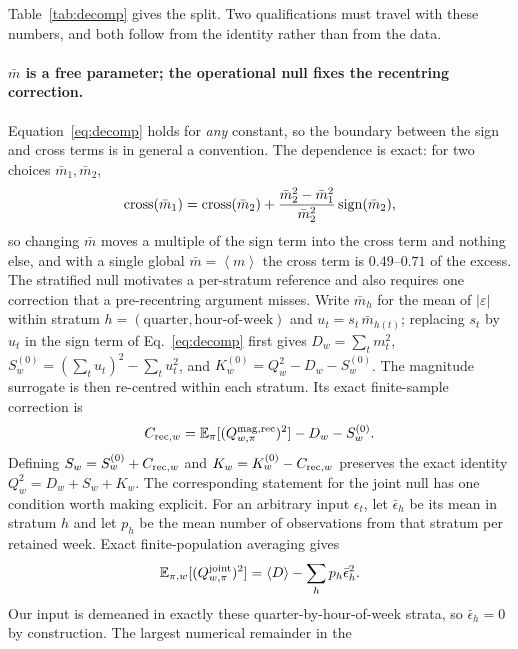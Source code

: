 \documentclass[aps,pre,twocolumn,superscriptaddress,floatfix,nofootinbib]{revtex4-2}
\newcommand{\eps}{\varepsilon}
\newcommand{\avg}[1]{\left\langle #1 \right\rangle}
\begin{document}
Table~\ref{tab:decomp} gives the split. Two qualifications must travel with
these numbers, and both follow from the identity rather than from the data.

\paragraph*{$\bar m$ is a free parameter; the operational null fixes the
recentring correction.}
Equation~\eqref{eq:decomp} holds for \emph{any} constant, so the boundary
between the sign and cross terms is in general a convention. The dependence is
exact: for two choices $\bar m_1,\bar m_2$,
\begin{equation}
  {\rm cross}(\bar m_1)={\rm cross}(\bar m_2)
   +\frac{\bar m_2^{2}-\bar m_1^{2}}{\bar m_2^{2}}\,{\rm sign}(\bar m_2) ,
  \label{eq:mbarshift}
\end{equation}
so changing $\bar m$ moves a multiple of the sign term into the cross term and
nothing else, and with a single global $\bar m=\avg{m}$ the cross term is
$0.49$--$0.71$ of the excess. The stratified null motivates a per-stratum
reference and also requires one correction that a pre-recentring argument
misses.
Write $\bar m_{h}$ for the mean of $|\eps|$ within stratum $h=(\text{quarter},
\text{hour-of-week})$ and $u_t=s_t\,\bar m_{h(t)}$; replacing $s_t$ by $u_t$ in
the sign term of Eq.~\eqref{eq:decomp} first gives $D_w=\sum_t m_t^2$,
$S_w^{(0)}=(\sum_t u_t)^2-\sum_t u_t^2$, and
$K_w^{(0)}=Q_w^2-D_w-S_w^{(0)}$. The magnitude surrogate is then re-centred
within each stratum. Its exact finite-sample correction is
\begin{equation}
 C_{{\rm rec},w}=\mathbb E_\pi[(Q_{w,\pi}^{\rm mag,rec})^2]
                    -D_w-S_w^{(0)} .
 \label{eq:reccorrection}
\end{equation}
Defining $S_w=S_w^{(0)}+C_{{\rm rec},w}$ and
$K_w=K_w^{(0)}-C_{{\rm rec},w}$ preserves the exact identity
$Q_w^2=D_w+S_w+K_w$. The corresponding statement for the joint null has one
condition worth making explicit. For an arbitrary input $\epsilon_t$, let
$\bar\epsilon_h$ be its mean in stratum $h$ and let $p_h$ be the mean number
of observations from that stratum per retained week. Exact finite-population
averaging gives
\begin{equation}
 \mathbb E_{\pi,w}[(Q_{w,\pi}^{\rm joint})^2]
   =\avg{D}-\sum_h p_h\bar\epsilon_h^2 .
 \label{eq:jointcorrection}
\end{equation}
Our input is demeaned in exactly these quarter-by-hour-of-week strata, so
$\bar\epsilon_h=0$ by construction. The largest numerical remainder in the
\end{document}
